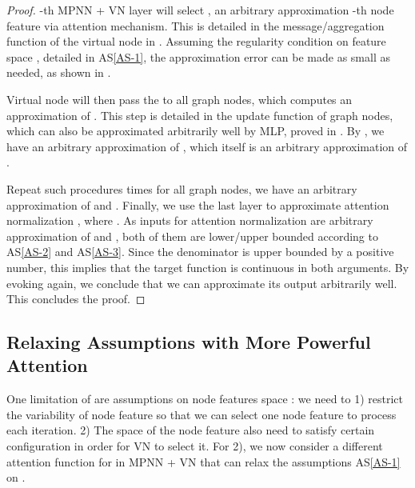 \documentclass[nohyperref]{article}
\theoremstyle{plain}
\theoremstyle{definition}
\theoremstyle{remark}
\begin{document}
\mainthm*
\begin{proof}
-th MPNN + VN layer will select , an arbitrary approximation -th node feature  via attention mechanism. This is detailed in the message/aggregation function of the virtual node in . Assuming the regularity condition on feature space , detailed in AS\ref{AS-1}, the approximation error can be made as small as needed, as shown in . 

Virtual node will then pass the  to all graph nodes, which computes an approximation of . This step is detailed in the update function  of graph nodes, which can also be approximated arbitrarily well by MLP, proved in . By , we have an arbitrary approximation of , which itself is an arbitrary approximation of . 

Repeat such procedures  times for all graph nodes, we have an arbitrary approximation of  and . Finally, we use the last layer to approximate attention normalization , where . As inputs for attention normalization are arbitrary approximation of  and , both of them are lower/upper bounded according to AS\ref{AS-2} and AS\ref{AS-3}. Since the denominator is upper bounded by a positive number, this implies that the target function  is continuous in both arguments. By evoking  again, we conclude that we can approximate its output  arbitrarily well. This concludes the proof. 

\end{proof}











\subsection{Relaxing Assumptions with More Powerful Attention}
\label{subsec:relax-assumption}
One limitation of  are assumptions on node features space : we need to 1) restrict the variability of node feature so that we can select one node feature to process each iteration. 2) The space of the node feature also need to satisfy certain configuration in order for VN to select it.  For 2), we now consider a different attention function for  in MPNN + VN that can relax the assumptions AS\ref{AS-1} on . 
\end{document}
